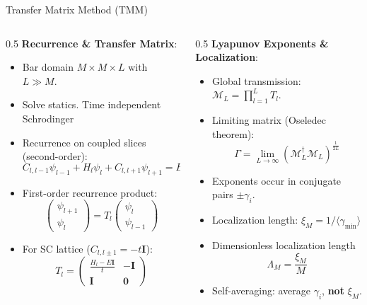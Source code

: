 \documentclass[10pt,aspectratio=169]{beamer}
\begin{document}
\begin{frame}{Transfer Matrix Method (TMM)}
  \begin{columns}
    \begin{column}{0.5\textwidth}
      \textbf{Recurrence \& Transfer Matrix}:
      \begin{itemize}
        \item Bar domain $M \times M \times L$ with $L \gg M$.
        \item Solve statics. Time independent Schrodinger
        \item Recurrence on coupled slices (second-order):
          $$C_{l, l-1} \psi_{l-1} + H_l \psi_l + C_{l, l+1} \psi_{l+1} = E \psi_l$$
        \item First-order recurrence product:
          $$\begin{pmatrix} \psi_{l+1} \\ \psi_l \end{pmatrix} = T_l \begin{pmatrix} \psi_l \\ \psi_{l-1} \end{pmatrix}$$
        \item For SC lattice ($C_{l,l\pm1} = -t\mathbf{I}$):
          $$T_l = \begin{pmatrix} \frac{H_l - E\mathbf{I}}{t} & -\mathbf{I} \\ \mathbf{I} & \mathbf{0} \end{pmatrix}$$
      \end{itemize}
    \end{column}
    \begin{column}{0.5\textwidth}
      \textbf{Lyapunov Exponents \& Localization}:
      \begin{itemize}
        \item Global transmission: $\mathcal{M}_L = \prod_{l=1}^L T_l$.
        \item Limiting matrix (Oseledec theorem):
          $$\Gamma = \lim_{L \to \infty} \left( \mathcal{M}_L^\dagger \mathcal{M}_L \right)^{\frac{1}{2L}}$$
        \item Exponents occur in conjugate pairs $\pm\gamma_i$.
        \item Localization length: $\xi_M = 1/\langle \gamma_{\text{min}} \rangle$
        \item Dimensionless localization length
          $$\Lambda_M = \frac{\xi_M}{M}$$
        \item Self-averaging: average $\gamma_i$, \textbf{not} $\xi_M$.
      \end{itemize}
    \end{column}
  \end{columns}
\end{frame}
\end{document}
